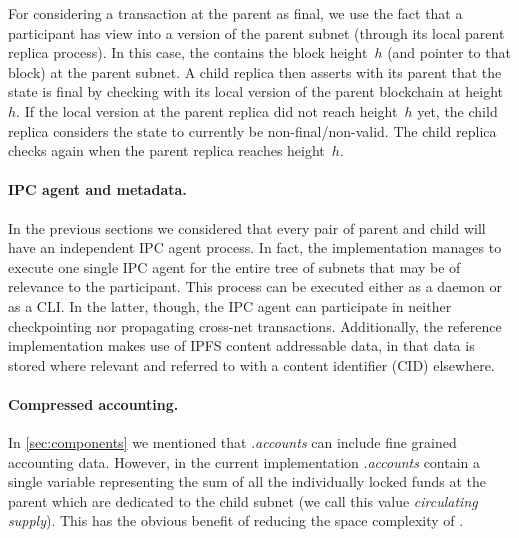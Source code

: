  For considering a transaction \tx at the parent as final, we use the fact that a participant has view into a version of the parent subnet (through its local parent replica process). In this case, the \prf contains the block height~$h$ (and pointer to that block) at the parent subnet. A child replica then asserts with its parent that the state is final by checking with its local version of the parent blockchain at height~$h$. If the local version at the parent replica did not reach height~$h$ yet, the child replica considers the state to currently be non-final/non-valid. The child replica checks again when the parent replica reaches height~$h$. 

\paragraph{IPC agent and metadata.} In the previous sections we considered that every pair of parent and child will have an independent IPC agent process. In fact, the implementation manages to execute one single IPC agent for the entire tree of subnets that may be of relevance to the participant. This process can be executed either as a daemon or as a CLI. In the latter, though, the IPC agent can participate in neither checkpointing nor propagating cross-net transactions. Additionally, the reference implementation makes use of IPFS content addressable data, in that data is stored where relevant and referred to with a content identifier (CID) elsewhere. 

\paragraph{Compressed accounting.}
In \cref{sec:components} we mentioned that \sa.\textit{accounts} can include fine grained accounting data. However, in the current implementation \sa.\textit{accounts} contain a single variable representing the sum of all the individually locked funds at the parent which are dedicated to the child subnet (we call this value \textit{circulating supply}). This has the obvious benefit of reducing the space complexity of \sa.

